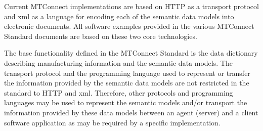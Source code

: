 \documentclass{mtconnect}	%
\begin{document}
Current MTConnect implementations are based on HTTP as a transport protocol and \gls{xml} as a language for encoding each of the \glspl{semantic data model} into electronic documents.  All software examples provided in the various MTConnect Standard documents are based on these two core technologies.  

The base functionality defined in the MTConnect Standard is the \gls{data dictionary} describing manufacturing information and the \glspl{semantic data model}.  The transport protocol and the programming language used to represent or transfer the information provided by the \glspl{semantic data model} are not restricted in the standard to HTTP and \gls{xml}.  Therefore, other protocols and programming languages may be used to represent the semantic models and/or transport the information provided by these data models between an \gls{agent} (server) and a client software application as may be required by a specific implementation.
\end{document}
